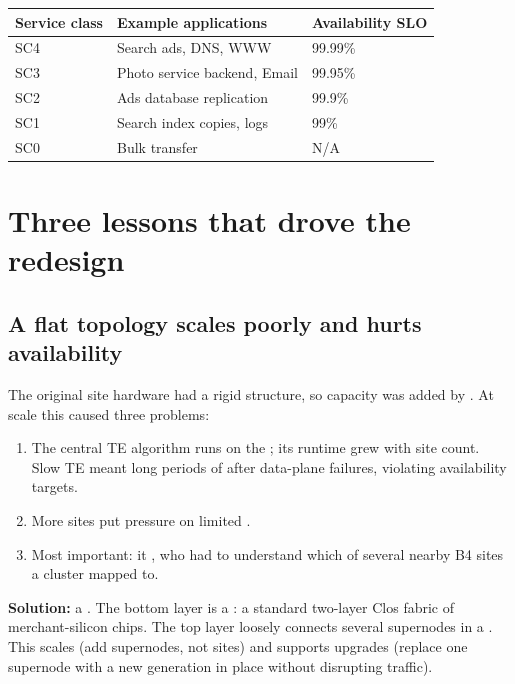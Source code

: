 \begin{center}
\begin{tabular}{@{}lll@{}}
\toprule
\textbf{Service class} & \textbf{Example applications} & \textbf{Availability SLO} \\
\midrule
SC4 & Search ads, DNS, WWW & 99.99\% \\
SC3 & Photo service backend, Email & 99.95\% \\
SC2 & Ads database replication & 99.9\% \\
SC1 & Search index copies, logs & 99\% \\
SC0 & Bulk transfer & N/A \\
\bottomrule
\end{tabular}
\end{center}

\section{Three lessons that drove the redesign}
\subsection{A flat topology scales poorly and hurts availability}
The original site hardware had a rigid structure, so capacity was added by . At scale this caused three problems:
\begin{enumerate}
\item The central TE algorithm runs on the ; its runtime grew  with site count. Slow TE meant long periods of  after data-plane failures, violating availability targets.
\item More sites put pressure on limited .
\item Most important: it , who had to understand which of several nearby B4 sites a cluster mapped to.
\end{enumerate}
\textbf{Solution:} a . The bottom layer is a : a standard two-layer Clos fabric of merchant-silicon chips. The top layer loosely connects several supernodes in a . This scales  (add supernodes, not sites) and supports  upgrades (replace one supernode with a new generation in place without disrupting traffic).

